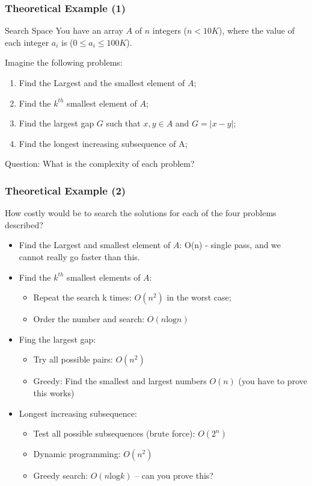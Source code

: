 \documentclass{beamer}
\begin{document}
\begin{frame}
  \frametitle{Theoretical Example (1)}

  \begin{block}{Search Space}
    You have an array $A$ of $n$ integers ($n < 10K$), where the value
    of each integer $a_i$ is ($0 \leq a_i \leq 100K$).
  \end{block}

  \bigskip

  Imagine the following problems:
  \begin{enumerate}
  \item Find the Largest and the smallest element of $A$;
  \item Find the $k^{th}$ smallest element of $A$;
  \item Find the largest gap $G$ such that $x,y \in A$ and $G = |x-y|$;
  \item Find the longest increasing subsequence of A;
  \end{enumerate}

  \bigskip

  \alert{Question:} What is the complexity of each problem?
\end{frame}

\begin{frame}
  \frametitle{Theoretical Example (2)}

  {\smaller
  How costly would be to search the solutions for each of the four
  problems described?

  \bigskip

  \begin{itemize}
  \item Find the Largest and smallest element of $A$: O(n) - single
    pass, and we cannot really go faster than this.
  \item Find the $k^{th}$ smallest elements of $A$:
    \begin{itemize}
    \item Repeat the search k times: $O(n^2)$ in the worst case;
    \item Order the number and search: $O(n\text{log}n)$
    \end{itemize}
  \item Fing the largest gap:
    \begin{itemize}
    \item Try all possible pairs: $O(n^2)$
    \item Greedy: Find the smallest and largest numbers $O(n)$ (you
      have to prove this works)
    \end{itemize}
  \item Longest increasing subsequence:
    \begin{itemize}
    \item Test all possible subsequences (brute force): $O(2^n)$
    \item Dynamic programming: $O(n^2)$
    \item Greedy search: $O(n\text{log}k)$ -- can you prove this?
    \end{itemize}
  \end{itemize}
  }
\end{frame}
\end{document}
